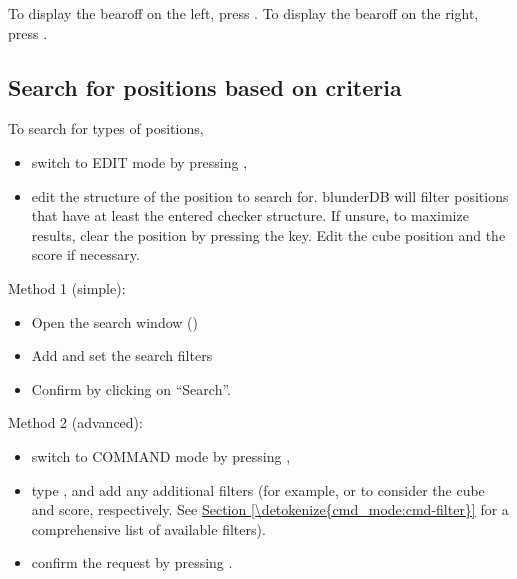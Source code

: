 \documentclass[letterpaper,10pt,english]{sphinxmanual}
\begin{document}
\sphinxAtStartPar
To display the bearoff on the left, press . To display the bearoff on the right, press .


\subsection{Search for positions based on criteria}
\label{\detokenize{guide_utilisateur:rechercher-des-positions-selon-des-criteres}}
\sphinxAtStartPar
To search for types of positions,
\begin{itemize}
\item {} 
\sphinxAtStartPar
switch to EDIT mode by pressing ,

\item {} 
\sphinxAtStartPar
edit the structure of the position to search for. blunderDB will filter positions that have at least the entered checker structure. If unsure, to maximize results, clear the position by pressing the  key. Edit the cube position and the score if necessary.

\end{itemize}

\sphinxAtStartPar
Method 1 (simple):
\begin{itemize}
\item {} 
\sphinxAtStartPar
Open the search window ()

\item {} 
\sphinxAtStartPar
Add and set the search filters

\item {} 
\sphinxAtStartPar
Confirm by clicking on “Search”.

\end{itemize}

\sphinxAtStartPar
Method 2 (advanced):
\begin{itemize}
\item {} 
\sphinxAtStartPar
switch to COMMAND mode by pressing ,

\item {} 
\sphinxAtStartPar
type , and add any additional filters (for example,  or  to consider the cube and score, respectively. See \hyperref[\detokenize{cmd_mode:cmd-filter}]{Section \ref{\detokenize{cmd_mode:cmd-filter}}} for a comprehensive list of available filters).

\item {} 
\sphinxAtStartPar
confirm the request by pressing .

\end{itemize}
\end{document}
